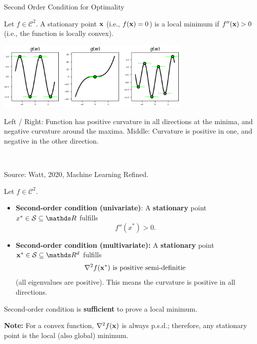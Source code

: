\documentclass[11pt,compress,t,notes=noshow, xcolor=table]{beamer}
\begin{document}
  \begin{vbframe}{Second Order Condition for Optimality}
  
  Let $f \in \mathcal{C}^2$. A stationary point $\mathbf{x}$ (i.e., $f(\mathbf{x}) = 0$) is a local minimum if $f''(\mathbf{x}) > 0$ (i.e., the function is locally convex). 

  \begin{center}
  \includegraphics[width = 0.7\textwidth]{figure_man/saddle_points_2.png} \\
  \begin{footnotesize}
  Left / Right: Function has positive curvature in all directions at the minima, and negative curvature around the maxima. Middle: Curvature is positive in one, and negative in the other direction. 
  \end{footnotesize}\\
  \begin{tiny}
  Source: Watt, 2020, Machine Learning Refined. 
  \end{tiny}
  \end{center}
  
  
  \framebreak 
  
  Let $f \in \mathcal{C}^2$.  

  \begin{itemize}
    \item \textbf{Second-order condition (univariate)}: A \textbf{stationary} point $x^\ast \in \mathcal{S}\subseteq \R$ fulfills
    $$f''(x^\ast) > 0.$$ 
    \item \textbf{Second-order condition (multivariate): } A \textbf{stationary} point $\xv^\ast \in \mathcal{S}\subseteq \R^d$ fulfills $$\nabla^2 f(\mathbf{x}^\ast) \text{ is positive semi-definitie}$$  (all eigenvalues are positive). This means the curvature is positive in all directions. 
  
  \end{itemize}
  
 Second-order condition is \textbf{sufficient} to prove a local minimum. 

 \lz 

 \textbf{Note:} For a convex function, $\nabla^2 f(\mathbf{x})$ is always p.s.d.; therefore, any stationary point is the local (also global) minimum. 
  



\end{vbframe}
\end{document}
